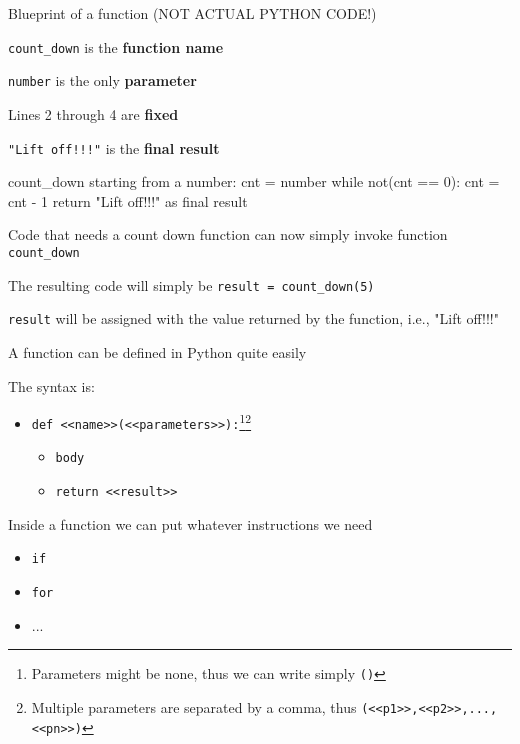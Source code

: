 \documentclass{beamer}
\begin{document}
\begin{frame}[fragile]{Blueprint of a function (NOT ACTUAL PYTHON CODE!)}
\begin{codewithblock}{\pause \item \texttt{count\_down} is the \textbf{function name} \item \texttt{number} is the only \textbf{parameter} \item Lines 2 through 4 are \textbf{fixed} \item \texttt{"Lift off!!!"} is the \textbf{final result}}
count_down starting from a number:
  cnt = number
  while not(cnt == 0):
   cnt = cnt - 1
  return "Lift off!!!" as final result
\end{codewithblock}
\end{frame}

\begin{slide}{
\item Code that needs a count down function can now simply invoke function \texttt{count\_down}
\item The resulting code will simply be \texttt{result = count\_down(5)}
\item \texttt{result} will be assigned with the value returned by the function, i.e., "Lift off!!!"
}\end{slide}

\begin{slide}{
\item A function can be defined in Python quite easily
\item The syntax is:
\begin{itemize}
\item \texttt{def <<name>>(<<parameters>>):}\footnote{Parameters might be none, thus we can write simply \texttt{()}}\footnote{Multiple parameters are separated by a comma, thus \texttt{(<<p1>>,<<p2>>,...,<<pn>>)}}
\begin{itemize}
\item \texttt{body}
\item \texttt{return <<result>>}
\end{itemize}
\end{itemize}
\item Inside a function we can put whatever instructions we need
\begin{itemize}
\item \texttt{if}
\item \texttt{for}
\item ...
\end{itemize}
}\end{slide}
\end{document}
